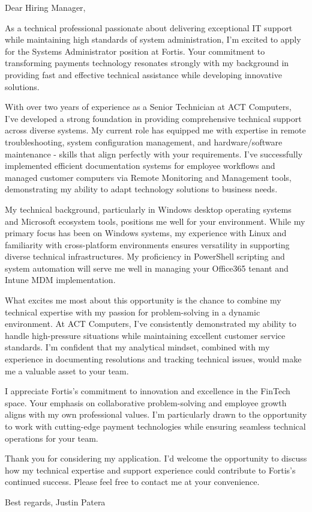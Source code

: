 
Dear Hiring Manager,

\smallskip

As a technical professional passionate about delivering exceptional IT support while maintaining high standards of system administration, I'm excited to apply for the Systems Administrator position at Fortis.
Your commitment to transforming payments technology resonates strongly with my background in providing fast and effective technical assistance while developing innovative solutions.

\smallskip

With over two years of experience as a Senior Technician at ACT Computers, I've developed a strong foundation in providing comprehensive technical support across diverse systems.
My current role has equipped me with expertise in remote troubleshooting, system configuration management, and hardware/software maintenance - skills that align perfectly with your requirements.
I've successfully implemented efficient documentation systems for employee workflows and managed customer computers via Remote Monitoring and Management tools, demonstrating my ability to adapt technology solutions to business needs.

\smallskip

My technical background, particularly in Windows desktop operating systems and Microsoft ecosystem tools, positions me well for your environment.
While my primary focus has been on Windows systems, my experience with Linux and familiarity with cross-platform environments ensures versatility in supporting diverse technical infrastructures.
My proficiency in PowerShell scripting and system automation will serve me well in managing your Office365 tenant and Intune MDM implementation.

\smallskip

What excites me most about this opportunity is the chance to combine my technical expertise with my passion for problem-solving in a dynamic environment.
At ACT Computers, I've consistently demonstrated my ability to handle high-pressure situations while maintaining excellent customer service standards.
I'm confident that my analytical mindset, combined with my experience in documenting resolutions and tracking technical issues, would make me a valuable asset to your team.

\smallskip

I appreciate Fortis's commitment to innovation and excellence in the FinTech space.
Your emphasis on collaborative problem-solving and employee growth aligns with my own professional values.
I'm particularly drawn to the opportunity to work with cutting-edge payment technologies while ensuring seamless technical operations for your team.

\smallskip

Thank you for considering my application.
I'd welcome the opportunity to discuss how my technical expertise and support experience could contribute to Fortis's continued success.
Please feel free to contact me at your convenience.

\smallskip

Best regards,
Justin Patera

